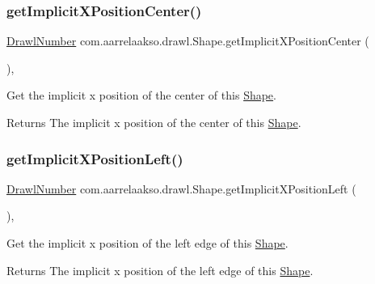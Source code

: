\subsubsection{\texorpdfstring{get\+Implicit\+X\+Position\+Center()}{getImplicitXPositionCenter()}}
{\footnotesize\ttfamily \hyperlink{classcom_1_1aarrelaakso_1_1drawl_1_1_drawl_number}{Drawl\+Number} com.\+aarrelaakso.\+drawl.\+Shape.\+get\+Implicit\+X\+Position\+Center (\begin{DoxyParamCaption}{ }\end{DoxyParamCaption})\hspace{0.3cm}{\ttfamily [protected]}, {\ttfamily [inherited]}}



Get the implicit x position of the center of this \hyperlink{classcom_1_1aarrelaakso_1_1drawl_1_1_shape}{Shape}. 

\begin{DoxyReturn}{Returns}
The implicit x position of the center of this \hyperlink{classcom_1_1aarrelaakso_1_1drawl_1_1_shape}{Shape}. 
\end{DoxyReturn}
\mbox{\label{classcom_1_1aarrelaakso_1_1drawl_1_1_shape_a3cc59779e8ce4a98ff2309e0fb414527}} 
\subsubsection{\texorpdfstring{get\+Implicit\+X\+Position\+Left()}{getImplicitXPositionLeft()}}
{\footnotesize\ttfamily \hyperlink{classcom_1_1aarrelaakso_1_1drawl_1_1_drawl_number}{Drawl\+Number} com.\+aarrelaakso.\+drawl.\+Shape.\+get\+Implicit\+X\+Position\+Left (\begin{DoxyParamCaption}{ }\end{DoxyParamCaption})\hspace{0.3cm}{\ttfamily [protected]}, {\ttfamily [inherited]}}



Get the implicit x position of the left edge of this \hyperlink{classcom_1_1aarrelaakso_1_1drawl_1_1_shape}{Shape}. 

\begin{DoxyReturn}{Returns}
The implicit x position of the left edge of this \hyperlink{classcom_1_1aarrelaakso_1_1drawl_1_1_shape}{Shape}. 
\end{DoxyReturn}
\mbox{\label{classcom_1_1aarrelaakso_1_1drawl_1_1_shape_aedcaf32e6be1114111e5ee2ddb1214a3}} 
